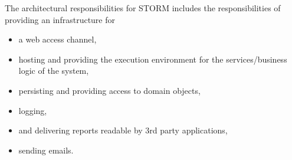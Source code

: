 The architectural responsibilities for STORM includes the responsibilities of providing an infrastructure for
\begin{itemize}
\item a web access channel,
\item hosting and providing the execution environment for the services/business logic of the system,
\item persisting and providing access to domain objects,
\item logging,
\item and delivering reports readable by 3rd party applications,
\item sending emails.
\end{itemize}